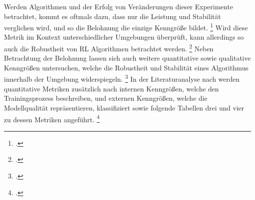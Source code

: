 Werden Algorithmen und der Erfolg von Veränderungen dieser Experimente betrachtet, kommt es oftmals dazu, dass nur die Leistung und Stabilität verglichen wird, und so die Belohnung die einzige Kenngröße bildet. \footcite[Vgl.][S. 6]{YanDuan.2016}
Wird diese Metrik im Kontext unterschiedlicher Umgebungen überprüft, kann allerdings so auch die Robustheit von RL Algorithmen betrachtet werden. \footcite[Vgl.][S. 6]{Pinto.2017}
Neben Betrachtung der Belohnung lassen sich auch weitere quantitative sowie qualitative Kenngrößen untersuchen, welche die Robustheit und Stabilität eines Algorithmus innerhalb der Umgebung widerspiegeln. \footcite[Vgl.][S. 15]{Pullum.2022}
In der Literaturanalyse nach \cite[]{Pullum.2022} werden quantitative Metriken zusätzlich nach internen Kenngrößen, welche den Trainingsprozess beschreiben, und externen Kenngrößen, welche die Modellqualität repräsentieren, klassifiziert sowie folgende Tabellen drei und vier zu dessen Metriken angeführt. \footcite[Vgl.][S. 16]{Pullum.2022}

